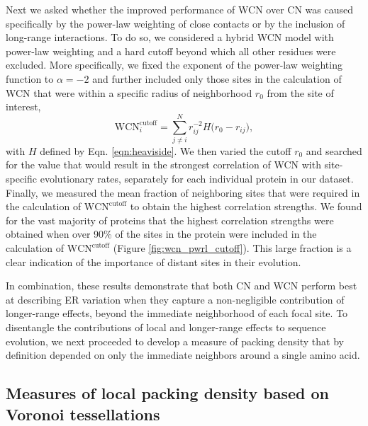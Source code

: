 \documentclass[12pt]{article}
\begin{document}
Next we asked whether the improved performance of WCN over CN was caused specifically by the power-law weighting of close contacts or by the inclusion of long-range interactions. To do so, we considered a hybrid WCN model with power-law weighting and a hard cutoff beyond which all other residues were excluded. More specifically, we fixed the exponent of the power-law weighting function to $\alpha=-2$ and further included only those sites in the calculation of WCN that were within a specific radius of neighborhood $r_0$ from the site of interest,
    \begin{equation}
        \label{eqn:wcn_pwrl_cutoff}
        \text{WCN}_{i}^\text{cutoff} = \sum^N_{j\neq i} r_{ij}^{-2} H\big(r_0-r_{ij}\big),
    \end{equation}
\noindent with $H$ defined by Eqn. \ref{eqn:heaviside}.
We then varied the cutoff $r_0$ and searched for the value that would result in the strongest correlation of WCN with site-specific evolutionary rates, separately for each individual protein in our dataset. Finally, we measured the mean fraction of neighboring sites that were required in the calculation of $\text{WCN}^\text{cutoff}$  to obtain the highest correlation strengths. We found for the vast majority of proteins that the highest correlation strengths were obtained when over 90\% of the sites in the protein were included in the calculation of $\text{WCN}^\text{cutoff}$ (Figure \ref{fig:wcn_pwrl_cutoff}). This large fraction is a clear indication of the importance of distant sites in their evolution.

In combination, these results demonstrate that both CN and WCN perform best at describing ER variation when they capture a non-negligible contribution of longer-range effects, beyond the immediate neighborhood of each focal site. To disentangle the contributions of local and longer-range effects to sequence evolution, we next proceeded to develop a measure of packing density that by definition depended on only the immediate neighbors around a single amino acid.


\subsection*{Measures of local packing density based on Voronoi tessellations}
\end{document}
